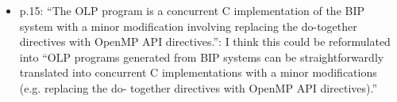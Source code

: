 \begin{itemize}
\item p.15: ``The OLP program is a concurrent C implementation of the BIP system with a minor 
modification involving replacing the do-together directives with OpenMP API directives.'': I think this 
could be reformulated into ``OLP programs generated from BIP systems can be straightforwardly 
translated into concurrent C implementations with a minor modifications (e.g. replacing the do-
together directives with OpenMP API directives).''

\done 

\end{itemize}
